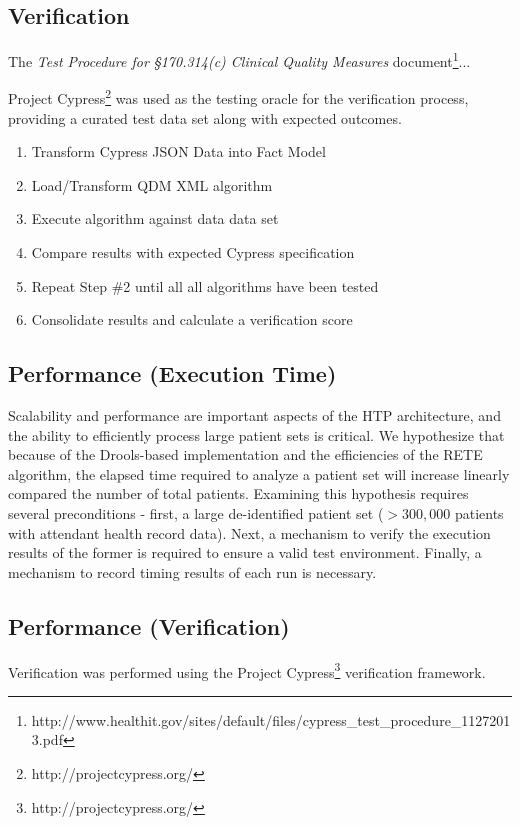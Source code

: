 \documentclass{amia}
\begin{document}
\subsection*{Verification}
The \textit{Test Procedure for §170.314(c) Clinical Quality Measures} document\footnote{http://www.healthit.gov/sites/default/files/cypress\_test\_procedure\_11272013.pdf}...

Project Cypress\footnote{http://projectcypress.org/} was used as the testing oracle for the verification process, providing a curated test data set along with expected outcomes.

\begin{enumerate}
  \item Transform Cypress JSON Data into Fact Model
  \item Load/Transform QDM XML algorithm
  \item Execute algorithm against data data set
  \item Compare results with expected Cypress specification
  \item Repeat Step \#2 until all all algorithms have been tested
  \item Consolidate results and calculate a verification score
\end{enumerate}


\subsection*{Performance (Execution Time)}
Scalability and performance are important aspects of the HTP architecture, and the ability to efficiently process large patient sets is critical. We hypothesize that because of the Drools-based implementation and the efficiencies of the RETE algorithm, the elapsed time required to analyze a patient set will increase linearly compared the number of total patients. Examining this hypothesis requires several preconditions - first, a large de-identified patient set ($> 300,000$ patients with attendant health record data). Next, a mechanism to verify the execution results of the former is required to ensure a valid test environment. Finally, a mechanism to record timing results of each run is necessary.\\


\subsection*{Performance (Verification)}
Verification was performed using the Project Cypress\footnote{http://projectcypress.org/} verification framework.
\end{document}
